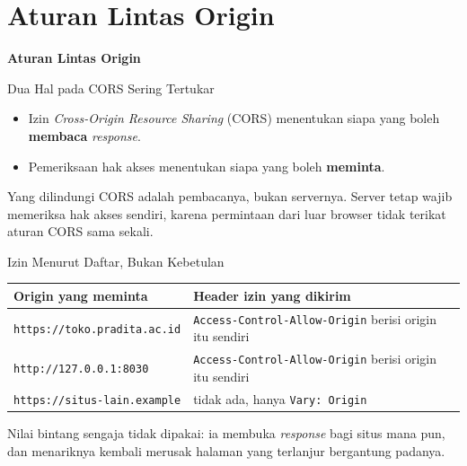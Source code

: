 \documentclass[aspectratio=169, table, 12pt]{beamer}
\begin{document}
\section{Aturan Lintas Origin}

\begin{frame}{\hfill}
  \centering
  \Huge{\textbf{Aturan Lintas Origin}}
\end{frame}

\begin{frame}{{\Large Dua Hal pada CORS Sering Tertukar}}
  \vspace{12pt}
  \begin{itemize}
    \item Izin \textit{Cross-Origin Resource Sharing} (CORS) menentukan
          siapa yang boleh \textbf{membaca} \textit{response}.
    \item Pemeriksaan hak akses menentukan siapa yang boleh \textbf{meminta}.
  \end{itemize}
  \vspace{10pt}
  {\small Yang dilindungi CORS adalah pembacanya, bukan servernya. Server
  tetap wajib memeriksa hak akses sendiri, karena permintaan dari luar
  browser tidak terikat aturan CORS sama sekali.}
\end{frame}

\begin{frame}{{\Large Izin Menurut Daftar, Bukan Kebetulan}}
  \vspace{6pt}
  \centering
  {\footnotesize
  \begin{tabularx}{\textwidth}{lY}
    \hline
    \textbf{Origin yang meminta} & \textbf{Header izin yang dikirim} \\
    \hline
    \texttt{https://toko.pradita.ac.id} & \texttt{Access-Control-Allow-Origin} berisi origin itu sendiri \\
    \hline
    \texttt{http://127.0.0.1:8030} & \texttt{Access-Control-Allow-Origin} berisi origin itu sendiri \\
    \hline
    \texttt{https://situs-lain.example} & tidak ada, hanya \texttt{Vary: Origin} \\
    \hline
  \end{tabularx}}

  \vspace{8pt}
  {\small Nilai bintang sengaja tidak dipakai: ia membuka \textit{response}
  bagi situs mana pun, dan menariknya kembali merusak halaman yang terlanjur
  bergantung padanya.}
\end{frame}
\end{document}
